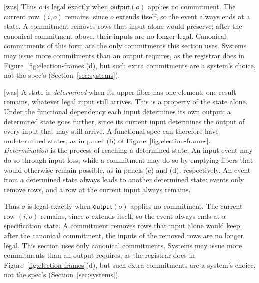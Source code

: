 \documentclass[sigconf]{cidr-2027}
\theoremstyle{remark}
\newcommand{\commitment}{commitment\xspace}
\newcommand{\commitments}{commitments\xspace}
\newcommand{\outrel}{extends\xspace}          %
\begin{document}
{\footnotesize\color{black!50}\noindent\textsf{[was]} Thus $o$ is legal exactly when $\mathsf{output}(o)$ applies no \commitment.  The
current row $(i,o)$ remains, since $o$ \outrel itself, so the event always ends
at a state. A \commitment removes rows that input alone would preserve; after
the canonical \commitment above, their inputs are no longer legal.  Canonical
\commitments of this form are the only \commitments this section uses.  Systems
may issue more \commitments than an output requires, as the registrar does in
Figure~\ref{fig:election-frames}(d), but such extra \commitments are a
system's choice, not the spec's (Section~\ref{sec:systems}).\par}



{\footnotesize\color{black!50}\noindent\textsf{[was]} A state is \emph{determined} when its upper fiber has one element: one result
remains, whatever legal input still arrives.  This is a property of the state
alone.  Under the functional dependency each input determines its own
output; a determined state goes further, since its current input determines
the output of every input that may still arrive.  A functional spec
can therefore have undetermined states, as in panel~(b) of
Figure~\ref{fig:election-frames}.  \emph{Determination} is the process of
reaching a determined state.  An input event may do so through input loss,
while a \commitment may do so by emptying fibers that would otherwise
remain possible, as in panels (c) and (d), respectively.
An event from a determined state always leads to another determined state:
events only remove rows, and a row at the current input always remains.\par}

\color{blue!70!black}Thus $o$ is legal exactly when $\mathsf{output}(o)$ applies no \commitment.  The
current row $(i,o)$ remains, since $o$ \outrel itself, so the event always ends
at a specification state.  A \commitment removes rows that input alone would
keep; after the canonical \commitment, the inputs of the removed rows are no
longer legal.  This section uses only canonical \commitments.  Systems
may issue more \commitments than an output requires, as the registrar does in
Figure~\ref{fig:election-frames}(d), but such extra \commitments are a
system's choice, not the spec's (Section~\ref{sec:systems}).\color{black}
\end{document}
